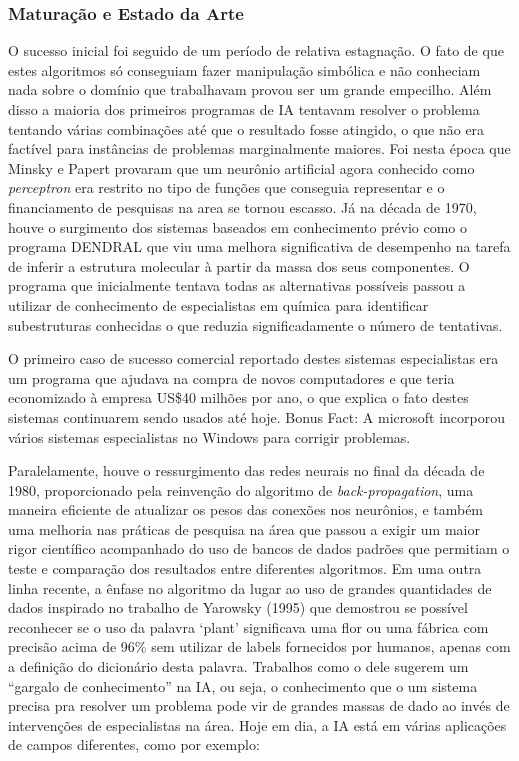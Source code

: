 \documentclass[cic,tc]{iiufrgs}
\begin{document}
\subsubsection{Maturação e Estado da Arte}

O sucesso inicial foi seguido de um período de relativa estagnação. O fato de
que estes algoritmos só conseguiam fazer manipulação simbólica e não conheciam
nada sobre o domínio que trabalhavam provou ser um grande empecilho. Além disso
a maioria dos primeiros programas de IA tentavam resolver o problema tentando
várias combinações até que o resultado fosse atingido, o que não era factível
para instâncias de problemas marginalmente maiores. Foi nesta época que Minsky
e Papert provaram que um neurônio artificial agora conhecido como
\emph{perceptron} era restrito no tipo de funções que conseguia representar e o
financiamento de pesquisas na area se tornou escasso. Já na década de 1970,
houve o surgimento dos sistemas baseados em conhecimento prévio como o programa
DENDRAL que viu uma melhora significativa de desempenho na tarefa de inferir a
estrutura molecular à partir da massa dos seus componentes. O programa que
inicialmente tentava todas as alternativas possíveis passou a utilizar de
conhecimento de especialistas em química para identificar subestruturas
conhecidas o que reduzia significadamente o número de tentativas.

O primeiro caso de sucesso comercial reportado destes sistemas especialistas
era um programa que ajudava na compra de novos computadores e que teria
economizado à empresa US\$40 milhões por ano, o que explica o fato destes
sistemas continuarem sendo usados até hoje.  Bonus Fact: A microsoft incorporou
vários sistemas especialistas no Windows para corrigir problemas.

Paralelamente, houve o ressurgimento das redes neurais no final da década de
1980, proporcionado pela reinvenção do algoritmo de \emph{back-propagation},
uma maneira eficiente de atualizar os pesos das conexões nos neurônios, e
também uma melhoria nas práticas de pesquisa na área que passou a exigir um
maior rigor científico acompanhado do uso de bancos de dados padrões que
permitiam o teste e comparação dos resultados entre diferentes algoritmos. Em
uma outra linha recente, a ênfase no algoritmo da lugar ao uso de grandes
quantidades de dados inspirado no trabalho de Yarowsky (1995) que demostrou se
possível reconhecer se o uso da palavra `plant' significava uma flor ou uma
fábrica com precisão acima de 96\% sem utilizar de labels fornecidos por
humanos, apenas com a definição do dicionário desta palavra. Trabalhos como o
dele sugerem um ``gargalo de conhecimento'' na IA, ou seja, o conhecimento que
o um sistema precisa pra resolver um problema pode vir de grandes massas de
dado ao invés de intervenções de especialistas na área. Hoje em dia, a IA está
em várias aplicações de campos diferentes, como por exemplo:
\end{document}
